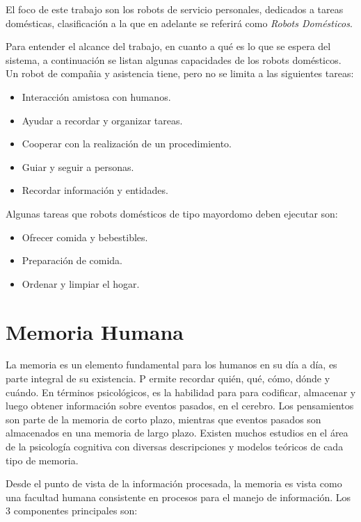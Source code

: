 El foco de este trabajo son los robots de servicio personales, dedicados a tareas dom\'esticas, clasificaci\'on a la que en  adelante se referir\'a como \textit{Robots Dom\'esticos}.

Para entender el alcance del trabajo, en cuanto a qu\'e es lo que se espera del sistema, a continuaci\'on se listan algunas capacidades de los robots dom\'esticos. Un robot de compa\~nia y asistencia tiene, pero no se limita a las siguientes tareas:
\begin{itemize}[topsep=0pt]
\setlength\itemsep{0.2em}
\item Interacci\'on amistosa con humanos.
\item Ayudar a recordar y organizar tareas.
\item Cooperar con la realizaci\'on de un procedimiento.
\item Guiar y seguir a personas.
\item Recordar informaci\'on y entidades.
\end{itemize}
\bigskip

Algunas tareas que robots dom\'esticos de tipo mayordomo deben ejecutar son:
\begin{itemize}[topsep=0pt]
\setlength\itemsep{0.2em}
\item Ofrecer comida y bebestibles.
\item Preparaci\'on de comida.
\item Ordenar y limpiar el hogar.
\end{itemize}
\bigskip


\section{Memoria Humana}

La memoria es un elemento fundamental para los humanos en su d\'ia a d\'ia, es parte integral de su existencia. P ermite recordar qui\'en, qu\'e, c\'omo, d\'onde y cu\'ando. En t\'erminos psicol\'ogicos, es la habilidad para para codificar, almacenar y luego obtener informaci\'on sobre eventos pasados, en el cerebro. Los pensamientos son parte de la memoria de corto plazo, mientras que eventos pasados son almacenados en una memoria de largo plazo. Existen muchos estudios en el \'area de la psicolog\'ia cognitiva con diversas descripciones y modelos te\'oricos de cada tipo de memoria\cite{Vijayakumar2014}.

Desde el punto de vista de la informaci\'on procesada, la memoria es vista como una facultad humana consistente en procesos para el manejo de informaci\'on. Los 3 componentes principales son:

